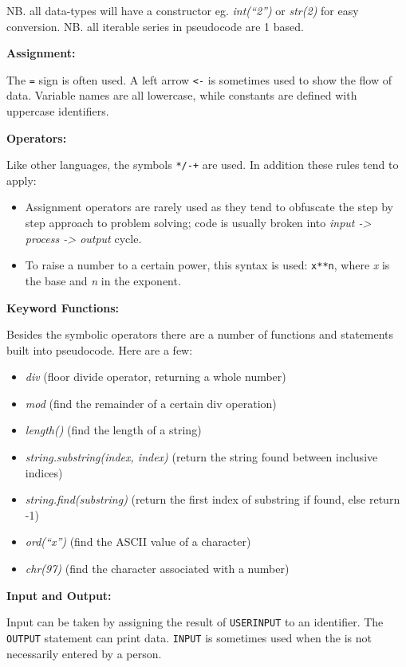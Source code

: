 \documentclass[9pt]{article}
\begin{document}
NB. all data-types will have a constructor eg. \emph{int(``2'')} or \emph{str(2)} for easy conversion.
NB. all iterable series in pseudocode are 1 based.

\textbf{Assignment:}

The \texttt{=} sign is often used. A left arrow \texttt{<-} is sometimes used to show the flow of data. Variable names are all lowercase, while constants are defined with uppercase identifiers.

\textbf{Operators:}

Like other languages, the symbols \texttt{*/-+} are used. In addition these rules tend to apply:

\begin{itemize}
\item Assignment operators are rarely used as they tend to obfuscate the step by step approach to problem solving; code is usually broken into \emph{input -> process -> output} cycle.
\item To raise a number to a certain power, this syntax is used: \texttt{x**n}, where \emph{x} is the base and \emph{n} in the exponent.
\end{itemize}

\textbf{Keyword Functions:}

Besides the symbolic operators there are a number of functions and statements built into pseudocode. Here are a few:

\begin{itemize}
\item \emph{div} (floor divide operator, returning a whole number)
\item \emph{mod} (find the remainder of a certain div operation)
\item \emph{length()} (find the length of a string)
\item \emph{string.substring(index, index)} (return the string found between inclusive indices)
\item \emph{string.find(substring)} (return the first index of substring if found, else return -1)
\item \emph{ord(``x'')} (find the ASCII value of a character)
\item \emph{chr(97)} (find the character associated with a number)
\end{itemize}

\textbf{Input and Output:}

Input can be taken by assigning the result of \texttt{USERINPUT} to an identifier. The \texttt{OUTPUT} statement can print data. \texttt{INPUT} is sometimes used when the is not necessarily entered by a person.
\end{document}

